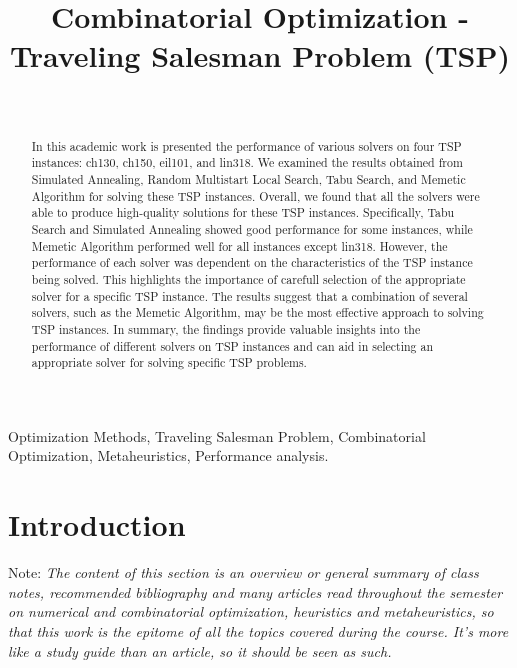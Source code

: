 \documentclass[conference]{IEEEtran}
\begin{document}
    \title{Combinatorial Optimization - Traveling Salesman Problem (TSP)}
    \author{
        \\
    }

    \maketitle

    \begin{abstract}
        In this academic work is presented the performance of various solvers on four TSP instances: ch130, ch150, eil101, and lin318. We examined the results obtained from Simulated Annealing, Random Multistart Local Search, Tabu Search, and Memetic Algorithm for solving these TSP instances. Overall, we found that all the solvers were able to produce high-quality solutions for these TSP instances. Specifically, Tabu Search and Simulated Annealing showed good performance for some instances, while Memetic Algorithm performed well for all instances except lin318. However, the performance of each solver was dependent on the characteristics of the TSP instance being solved. This highlights the importance of carefull selection of the appropriate solver for a specific TSP instance. The results suggest that a combination of several solvers, such as the Memetic Algorithm, may be the most effective approach to solving TSP instances. In summary, the findings provide valuable insights into the performance of different solvers on TSP instances and can aid in selecting an appropriate solver for solving specific TSP problems.
    \end{abstract}

    \begin{IEEEkeywords}
        Optimization Methods, Traveling Salesman Problem, Combinatorial Optimization, Metaheuristics,    Performance analysis.
    \end{IEEEkeywords}


    \section{Introduction}
    \label{sec:introduction}
    Note: \textit{The content of this section is an overview or general summary of class notes, recommended bibliography and many articles read throughout the semester on numerical and combinatorial optimization, heuristics and metaheuristics, so that this work is the epitome of all the topics covered during the course. It's more like a study guide than an article, so it should be seen as such.}
\end{document}
